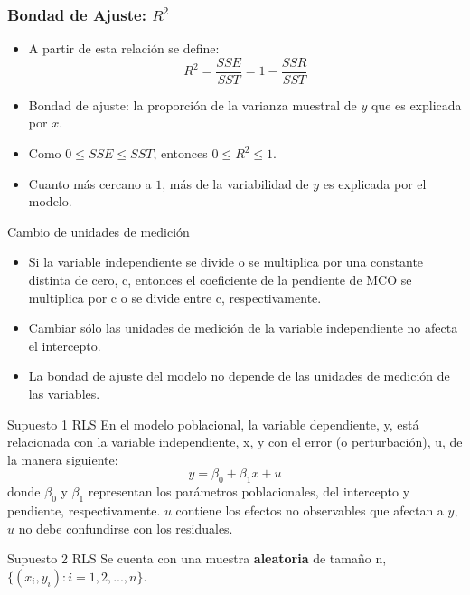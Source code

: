 \documentclass{beamer}
\begin{document}
\begin{frame}
	\frametitle{Bondad de Ajuste: $R^2$} %
	\begin{itemize}
		\item A partir de esta relación se define:
		\[ R^2 = \frac{SSE}{SST} = 1 - \frac{SSR}{SST} \]
		
		\item Bondad de ajuste: la proporción de la varianza muestral de $y$ que es explicada por $x$.
		
		\item Como $0 \leq SSE \leq SST$, entonces $0 \leq R^2 \leq 1$.
		
		
		\item Cuanto más cercano a $1$, más de la variabilidad de $y$ es explicada por el modelo.
	\end{itemize}
\end{frame}
 \begin{frame}{Cambio de unidades de medición}
    \begin{itemize}
        \item Si la variable
 independiente se divide o se multiplica por una constante distinta de cero, c, entonces el coeficiente
de la pendiente de MCO se multiplica por c o se divide entre c, respectivamente.
\item Cambiar sólo las unidades de medición de la variable independiente no afecta el intercepto.
\item  La bondad de ajuste del modelo no
 depende de las unidades de medición de las variables.
    \end{itemize}
    
 \end{frame}
\begin{frame}{Supuesto 1 RLS}
    En el modelo poblacional, la variable dependiente, y, está relacionada con la variable independiente,
x, y con el error (o perturbación), u, de la manera siguiente:\\
$$y=\beta_0 +\beta_1x+ u$$ 
donde $\beta_0$ y $\beta_1$ representan los parámetros poblacionales, del intercepto y pendiente, respectivamente.
$u$ contiene los efectos no observables que afectan a $y$, $u$ no debe confundirse con los residuales. 
\end{frame}
\begin{frame}{Supuesto 2 RLS}
    Se cuenta con una muestra {\bf aleatoria} de tamaño n, $\lbrace(x_i,y_i): i = 1, 2, ..., n\rbrace$.
\end{frame}
\end{document}
